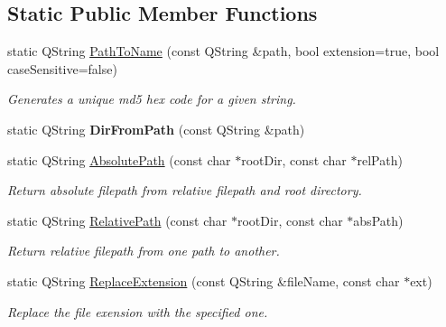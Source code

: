 \subsection*{Static Public Member Functions}
\begin{DoxyCompactItemize}
\item 
static Q\+String \mbox{\hyperlink{classrev_1_1_file_reader_ab0717bd108c516abc6fb7c8c7a58e744}{Path\+To\+Name}} (const Q\+String \&path, bool extension=true, bool case\+Sensitive=false)
\begin{DoxyCompactList}\small\item\em Generates a unique md5 hex code for a given string. \end{DoxyCompactList}\item 
\mbox{\label{classrev_1_1_file_reader_a8ee19353d4d5f0c0695422da57ac7374}} 
static Q\+String {\bfseries Dir\+From\+Path} (const Q\+String \&path)
\item 
\mbox{\label{classrev_1_1_file_reader_ae7316c1b35b7705459e4c571a0f79082}} 
static Q\+String \mbox{\hyperlink{classrev_1_1_file_reader_ae7316c1b35b7705459e4c571a0f79082}{Absolute\+Path}} (const char $\ast$root\+Dir, const char $\ast$rel\+Path)
\begin{DoxyCompactList}\small\item\em Return absolute filepath from relative filepath and root directory. \end{DoxyCompactList}\item 
\mbox{\label{classrev_1_1_file_reader_a9cf9a1b8273a1aac0447209800dfa82a}} 
static Q\+String \mbox{\hyperlink{classrev_1_1_file_reader_a9cf9a1b8273a1aac0447209800dfa82a}{Relative\+Path}} (const char $\ast$root\+Dir, const char $\ast$abs\+Path)
\begin{DoxyCompactList}\small\item\em Return relative filepath from one path to another. \end{DoxyCompactList}\item 
\mbox{\label{classrev_1_1_file_reader_a7def97841be55267a41554f0de2351b1}} 
static Q\+String \mbox{\hyperlink{classrev_1_1_file_reader_a7def97841be55267a41554f0de2351b1}{Replace\+Extension}} (const Q\+String \&file\+Name, const char $\ast$ext)
\begin{DoxyCompactList}\small\item\em Replace the file exension with the specified one. \end{DoxyCompactList}\item 

\end{DoxyCompactItemize}
